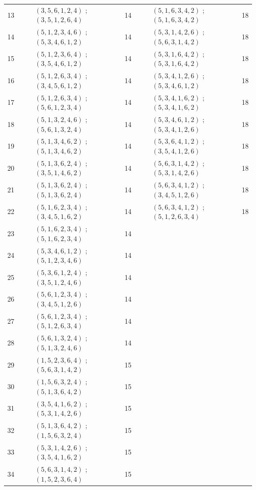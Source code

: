 \documentclass[a4paper,10pt]{amsart}
\theoremstyle{definition}
\numberwithin{equation}{section}
\begin{document}
\begin{center}
\begin{longtable}{r p{1.78cm} c p{4cm} c | p{1.78cm} c p{4.15cm} c}
13 &  &  & $(3,5,6,1,2,4)$ ; $(3,5,1,2,6,4)$ & 14 &  &  & $(5,1,6,3,4,2)$ ; $(5,1,6,3,4,2)$ & 18 \\
14 &  &  & $(5,1,2,3,4,6)$ ; $(5,3,4,6,1,2)$ & 14 &  &  & $(5,3,1,4,2,6)$ ; $(5,6,3,1,4,2)$ & 18 \\
15 &  &  & $(5,1,2,3,6,4)$ ; $(3,5,4,6,1,2)$ & 14 &  &  & $(5,3,1,6,4,2)$ ; $(5,3,1,6,4,2)$ & 18 \\
16 &  &  & $(5,1,2,6,3,4)$ ; $(3,4,5,6,1,2)$ & 14 &  &  & $(5,3,4,1,2,6)$ ; $(5,3,4,6,1,2)$ & 18 \\
17 &  &  & $(5,1,2,6,3,4)$ ; $(5,6,1,2,3,4)$ & 14 &  &  & $(5,3,4,1,6,2)$ ; $(5,3,4,1,6,2)$ & 18 \\
18 &  &  & $(5,1,3,2,4,6)$ ; $(5,6,1,3,2,4)$ & 14 &  &  & $(5,3,4,6,1,2)$ ; $(5,3,4,1,2,6)$ & 18 \\
19 &  &  & $(5,1,3,4,6,2)$ ; $(5,1,3,4,6,2)$ & 14 &  &  & $(5,3,6,4,1,2)$ ; $(3,5,4,1,2,6)$ & 18 \\
20 &  &  & $(5,1,3,6,2,4)$ ; $(3,5,1,4,6,2)$ & 14 &  &  & $(5,6,3,1,4,2)$ ; $(5,3,1,4,2,6)$ & 18 \\
21 &  &  & $(5,1,3,6,2,4)$ ; $(5,1,3,6,2,4)$ & 14 &  &  & $(5,6,3,4,1,2)$ ; $(3,4,5,1,2,6)$ & 18 \\
22 &  &  & $(5,1,6,2,3,4)$ ; $(3,4,5,1,6,2)$ & 14 &  &  & $(5,6,3,4,1,2)$ ; $(5,1,2,6,3,4)$ & 18 \\
23 &  &  & $(5,1,6,2,3,4)$ ; $(5,1,6,2,3,4)$ & 14 &  &  &  &  \\
24 &  &  & $(5,3,4,6,1,2)$ ; $(5,1,2,3,4,6)$ & 14 &  &  &  &  \\
25 &  &  & $(5,3,6,1,2,4)$ ; $(3,5,1,2,4,6)$ & 14 &  &  &  &  \\
26 &  &  & $(5,6,1,2,3,4)$ ; $(3,4,5,1,2,6)$ & 14 &  &  &  &  \\
27 &  &  & $(5,6,1,2,3,4)$ ; $(5,1,2,6,3,4)$ & 14 &  &  &  &  \\
28 &  &  & $(5,6,1,3,2,4)$ ; $(5,1,3,2,4,6)$ & 14 &  &  &  &  \\
29 &  &  & $(1,5,2,3,6,4)$ ; $(5,6,3,1,4,2)$ & 15 &  &  &  &  \\
30 &  &  & $(1,5,6,3,2,4)$ ; $(5,1,3,6,4,2)$ & 15 &  &  &  &  \\
31 &  &  & $(3,5,4,1,6,2)$ ; $(5,3,1,4,2,6)$ & 15 &  &  &  &  \\
32 &  &  & $(5,1,3,6,4,2)$ ; $(1,5,6,3,2,4)$ & 15 &  &  &  &  \\
33 &  &  & $(5,3,1,4,2,6)$ ; $(3,5,4,1,6,2)$ & 15 &  &  &  &  \\
34 &  &  & $(5,6,3,1,4,2)$ ; $(1,5,2,3,6,4)$ & 15 &  &  &  &  \\

\end{longtable}
\end{center}
\end{document}
